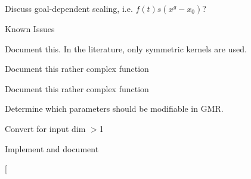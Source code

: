 
\begin{DoxyRefList}
\item[\label{todo__todo000006}%
\hypertarget{todo__todo000006}{}%
Page \hyperlink{page_dmp}{Dynamical Movement Primitives Module} ]Discuss goal-\/dependent scaling, i.\+e. $ f(t)s(x^g-x_0) $?

Known Issues 
\item[\label{todo__todo000012}%
\hypertarget{todo__todo000012}{}%
Member \hyperlink{classDmpBbo_1_1MetaParametersLWR_ac56e9aa7df627ac838cb4f9d6af5a525}{Meta\+Parameters\+L\+W\+R\+:\+:asymmetric\+\_\+kernels} (void) const ]Document this. In the literature, only symmetric kernels are used.  
\item[\label{todo__todo000011}%
\hypertarget{todo__todo000011}{}%
Member \hyperlink{classDmpBbo_1_1MetaParametersLWR_ab4dfc7a149e6637cb3e610ad827e3477}{Meta\+Parameters\+L\+W\+R\+:\+:get\+Centers\+And\+Widths} (const Eigen\+::\+Vector\+Xd \&min, const Eigen\+::\+Vector\+Xd \&max, Eigen\+::\+Matrix\+Xd \&centers, Eigen\+::\+Matrix\+Xd \&widths) const ]Document this rather complex function  
\item[\label{todo__todo000013}%
\hypertarget{todo__todo000013}{}%
Member \hyperlink{classDmpBbo_1_1MetaParametersRBFN_ab4dfc7a149e6637cb3e610ad827e3477}{Meta\+Parameters\+R\+B\+F\+N\+:\+:get\+Centers\+And\+Widths} (const Eigen\+::\+Vector\+Xd \&min, const Eigen\+::\+Vector\+Xd \&max, Eigen\+::\+Matrix\+Xd \&centers, Eigen\+::\+Matrix\+Xd \&widths) const ]Document this rather complex function  
\item[\label{todo__todo000014}%
\hypertarget{todo__todo000014}{}%
Member \hyperlink{classDmpBbo_1_1ModelParametersGMR_a887f4747734bd8b7cc4f799092ff31b4}{Model\+Parameters\+G\+M\+R\+:\+:get\+Selectable\+Parameters} (std\+::set$<$ std\+::string $>$ \&selected\+\_\+values\+\_\+labels) const ]Determine which parameters should be modifiable in G\+M\+R.  
\item[\label{todo__todo000015}%
\hypertarget{todo__todo000015}{}%
Member \hyperlink{classDmpBbo_1_1ModelParametersLWPR_a6e3534f93333334c2f0126f8fc4d29d1}{Model\+Parameters\+L\+W\+P\+R\+:\+:to\+Unified\+Model} (void) const ]Convert for input dim $>$1  
\item[\label{todo__todo000016}%
\hypertarget{todo__todo000016}{}%
Member \hyperlink{classDmpBbo_1_1ModelParametersLWR_a812ed8332b71789b6d8fd9355ff94fa7}{Model\+Parameters\+L\+W\+R\+:\+:set\+\_\+slopes\+\_\+as\+\_\+angles} (bool slopes\+\_\+as\+\_\+angles)]Implement and document  
\item[\label{todo__todo000018}%

\end{DoxyRefList}
